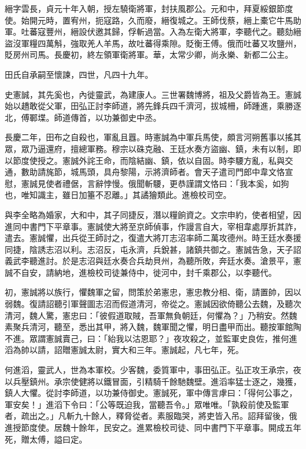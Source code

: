 \begin{pinyinscope}
 縉字雲長，貞元十年入朝，授左驍衛將軍，封扶風郡公。元和中，拜夏綏銀節度使。始開元時，置宥州，扼寇路，久而廢，縉復城之。王師伐蔡，縉上橐它牛馬助軍。吐蕃寇豐州，縉設伏邀其歸，俘斬過當。入為左衛大將軍，李聽代之。聽劾縉盜沒軍糧四萬斛，強取羌人羊馬，故吐蕃得乘隙。貶衡王傅。俄而吐蕃又攻鹽州，貶房州司馬。長慶初，終左領軍衛將軍。華，太常少卿，尚永樂、新都二公主。



 田氏自承嗣至懷諫，四世，凡四十九年。



 史憲誠，其先奚也，內徙靈武，為建康人。三世署魏博將，祖及父爵皆為王。憲誠始以趫敢從父軍，田弘正討李師道，將先鋒兵四千濟河，拔城柵，師踵進，乘勝逐北，傅鄆堞。師道傳首，以功兼御史中丞。



 長慶二年，田布之自殺也，軍亂且囂。時憲誠為中軍兵馬使，頗言河朔舊事以搖其眾，眾乃逼還府，擅總軍務。穆宗以硃克融、王廷水奏方盜幽、鎮，未有以制，即以節度使授之。憲誠外詫王命，而陰結幽、鎮，依以自固。時李騕方亂，私與交通，數助請旄節，城馬頭，具舟黎陽，示將濟師者。會天子遣司門郎中韋文恪宣慰，憲誠見使者禮倨，言辭悖慢。俄聞斬騕，更恭謹謂文恪曰：「我本奚，如狗也，唯知識主，雖日加箠不忍離。」其譎獪類此。進檢校司空。



 與李全略為婚家，大和中，其子同捷反，潛以糧餉資之。文宗申約，使者相望，因進同中書門下平章事。憲誠使大將至京師偵事，作謾言自大，宰相韋處厚折其詐，遣去。憲誠懼，出兵從王師討之，復遣大將丌志沼率師二萬攻德州。時王廷水奏援同捷，陰誘志沼以利。志沼反，屯永濟，兵銳甚，諸鎮共御之。憲誠告急，天子詔義武李聽進討。於是志沼與廷水奏合兵劫貝州，為聽所敗，奔廷水奏。滄景平，憲誠不自安，請納地，進檢校司徒兼侍中，徙河中，封千乘郡公，以李聽代。



 初，憲誠將以族行，懼魏軍之留，問策於弟憲忠，憲忠教分相、衛，請置帥，因以弱魏。復請詔聽引軍聲圖志沼而假道清河，帝從之。憲誠因欲倚聽公去魏，及聽次清河，魏人驚，憲忠曰：「彼假道取賊，吾軍無負朝廷，何懼為？」乃稍安。然魏素聚兵清河，聽至，悉出其甲，將入魏，魏軍聞之懼，明日盡甲而出。聽按軍館陶不進。眾謂憲誠賣己，曰：「紿我以沽恩耶？」夜攻殺之，並監軍史良佐，推何進滔為帥以請，詔贈憲誠太尉，實大和三年。憲誠起，凡七年，死。



 何進滔，靈武人，世為本軍校。少客魏，委質軍中，事田弘正。弘正攻王承宗，夜以兵壓鎮州。承宗使健將以鐵冒面，引精騎千餘馳魏壁。進滔率猛士逐之，幾獲，鎮人大懼。從討李師道，以功兼侍御史。憲誠死，軍中傳言虖曰：「得何公事之，軍安矣！」進滔下令曰：「公等既迫我，當聽吾令。」眾唯唯。「孰殺前使及監軍者，疏出之。」凡斬九十餘人，釋脅從者。素服臨哭，將吏皆入吊。詔拜留後，俄進授節度使。居魏十餘年，民安之。進累檢校司徒、同中書門下平章事。開成五年死，贈太傅，謚曰定。




\end{pinyinscope}
